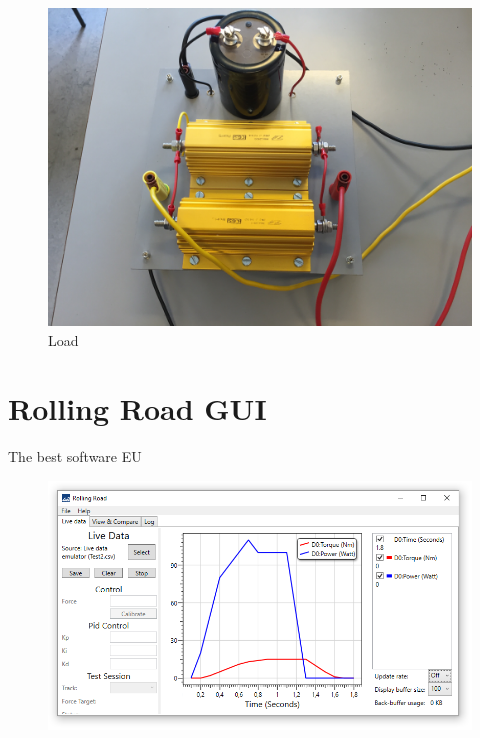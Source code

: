 \begin{figure}[h!]
\centering
\includegraphics[width=0.7\linewidth]{SubPages/Images/SD_RR_Load}
\caption{Load}
\label{fig:SD_RR_Load}
\end{figure}


\section{Rolling Road GUI}
The best software EU

\begin{figure}[h!]
\centering
\includegraphics[width=0.9\linewidth]{SubPages/Images/SD_GUI}
\caption{}
\label{fig:SD_GUI}
\end{figure}
